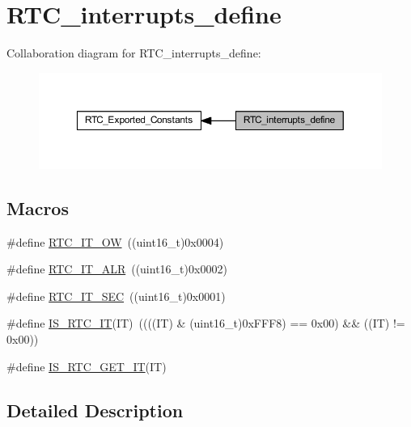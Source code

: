 \hypertarget{group___r_t_c__interrupts__define}{}\section{R\+T\+C\+\_\+interrupts\+\_\+define}
\label{group___r_t_c__interrupts__define}
Collaboration diagram for R\+T\+C\+\_\+interrupts\+\_\+define\+:
\nopagebreak
\begin{figure}[H]
\begin{center}
\leavevmode
\includegraphics[width=350pt]{group___r_t_c__interrupts__define}
\end{center}
\end{figure}
\subsection*{Macros}
\begin{DoxyCompactItemize}
\item 
\#define \hyperlink{group___r_t_c__interrupts__define_gabcfefb2f22cb8ca65113c2c13d0e0640}{R\+T\+C\+\_\+\+I\+T\+\_\+\+OW}~((uint16\+\_\+t)0x0004)
\item 
\#define \hyperlink{group___r_t_c__interrupts__define_ga92f0316a3c69aefc2b20c3392843d3da}{R\+T\+C\+\_\+\+I\+T\+\_\+\+A\+LR}~((uint16\+\_\+t)0x0002)
\item 
\#define \hyperlink{group___r_t_c__interrupts__define_ga960bccbc10da872549cf52c03dd342f1}{R\+T\+C\+\_\+\+I\+T\+\_\+\+S\+EC}~((uint16\+\_\+t)0x0001)
\item 
\#define \hyperlink{group___r_t_c__interrupts__define_ga5c941995b804ce4c7ef62e28e0133a83}{I\+S\+\_\+\+R\+T\+C\+\_\+\+IT}(IT)~((((IT) \& (uint16\+\_\+t)0x\+F\+F\+F8) == 0x00) \&\& ((\+I\+T) != 0x00))
\item 
\#define \hyperlink{group___r_t_c__interrupts__define_ga2e10d8ccb2aa398ac14bde526f98dbc9}{I\+S\+\_\+\+R\+T\+C\+\_\+\+G\+E\+T\+\_\+\+IT}(IT)
\end{DoxyCompactItemize}


\subsection{Detailed Description}


